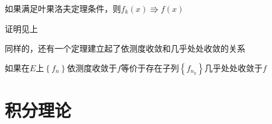 \documentclass[lang=cn,14pt]{elegantbook}
\begin{document}
 	\begin{theorem}
 		如果满足叶果洛夫定理条件，则$	f_k\left( x \right) \Rrightarrow f\left( x \right)$
 	\end{theorem}
 	证明见上
 	
 	同样的，还有一个定理建立起了依测度收敛和几乎处处收敛的关系
 	\begin{theorem}[里斯定理]
 		$\text{如果在}E\text{上}\left\{ f_n \right\} \text{依测度收敛于}f\text{等价于存在子列}\left\{ f_{n_k} \right\} \text{几乎处处收敛于}f
 		$
 	\end{theorem}
   \chapter{积分理论}
\end{document}
